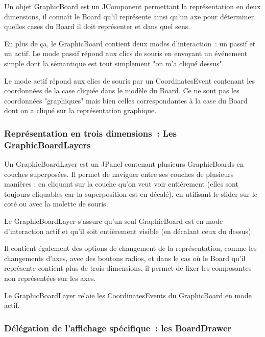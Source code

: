 	Un objet GraphicBoard est un JComponent permettant la représentation en deux dimensions, il connaît le Board qu'il représente ainsi qu'un axe pour déterminer quelles cases du Board il doit représenter et dans quel sens. \newline

	En plus de ça, le GraphicBoard contient deux modes d'interaction~: un passif et un actif.
Le mode passif répond aux clics de souris en envoyant un événement simple dont la sémantique est tout simplement "on m'a cliqué dessus". \newline

	Le mode actif répond aux clics de souris par un CoordinatesEvent contenant les coordonnées de la case cliquée dans le modèle du Board. Ce ne sont pas les coordonnées "graphiques" mais bien celles correspondantes à la case du Board dont on a cliqué sur la représentation graphique.

\subsubsection{Représentation en trois dimensions~: Les GraphicBoardLayers}
	Un GraphicBoardLayer est un JPanel contenant plusieurs GraphicBoards en couches superposées.
Il permet de naviguer entre ses couches de plusieurs manières : en cliquant sur la couche qu'on veut voir entièrement (elles sont toujours cliquables car la superposition est en décalé), en utilisant le slider sur le coté ou avec la molette de souris.
\newline

	Le GraphicBoardLayer s'assure qu'un seul GraphicBoard est en mode d'interaction actif et qu'il soit entièrement visible (en décalant ceux du dessus).
	\newline
	
	Il contient également des options de changement de la représentation, comme les changements d'axes, avec des boutons radios, et dans le cas où le Board qu'il représente contient plus de trois dimensions, il permet de fixer les composantes non représentées sur les axes.
\newline

Le GraphicBoardLayer relaie les CoordinatesEvents du GraphicBoard en mode actif.

\subsubsection{Délégation de l'affichage spécifique~: les BoardDrawer}

